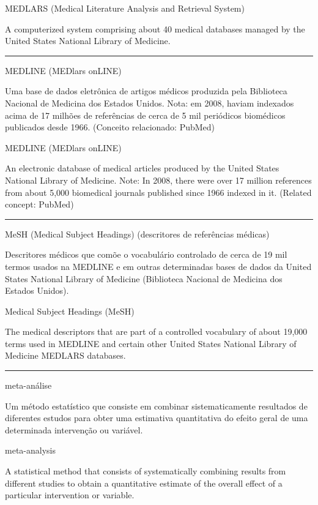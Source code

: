 \documentclass[
]{book}
\begin{document}
MEDLARS (Medical Literature Analysis and Retrieval System)

A computerized system comprising about 40 medical databases managed by the United States National Library of Medicine.

\begin{center}\rule{0.5\linewidth}{0.5pt}\end{center}

MEDLINE (MEDlars onLINE)

Uma base de dados eletrônica de artigos médicos produzida pela Biblioteca Nacional de Medicina dos Estados Unidos. Nota: em 2008, haviam indexados acima de 17 milhões de referências de cerca de 5 mil periódicos biomédicos publicados desde 1966. (Conceito relacionado: PubMed)

MEDLINE (MEDlars onLINE)

An electronic database of medical articles produced by the United States National Library of Medicine. Note: In 2008, there were over 17 million references from about 5,000 biomedical journals published since 1966 indexed in it. (Related concept: PubMed)

\begin{center}\rule{0.5\linewidth}{0.5pt}\end{center}

MeSH (Medical Subject Headings) (descritores de referências médicas)

Descritores médicos que comõe o vocabulário controlado de cerca de 19 mil termos usados na MEDLINE e em outras determinadas bases de dados da United States National Library of Medicine (Biblioteca Nacional de Medicina dos Estados Unidos).

Medical Subject Headings (MeSH)

The medical descriptors that are part of a controlled vocabulary of about 19,000 terms used in MEDLINE and certain other United States National Library of Medicine MEDLARS databases.

\begin{center}\rule{0.5\linewidth}{0.5pt}\end{center}

meta-análise

Um método estatístico que consiste em combinar sistematicamente resultados de diferentes estudos para obter uma estimativa quantitativa do efeito geral de uma determinada intervenção ou variável.

meta-analysis

A statistical method that consists of systematically combining results from different studies to obtain a quantitative estimate of the overall effect of a particular intervention or variable.
\end{document}
